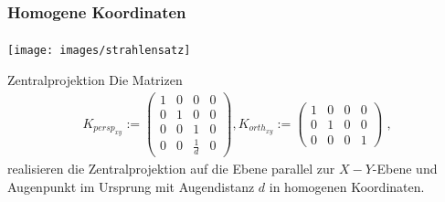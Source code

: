 \documentclass{beamer}
\begin{document}
\begin{frame}
    \frametitle{Homogene Koordinaten}
\framesubtitle{}
\begin{center}
    \texttt{[image: images/strahlensatz]}
\end{center}
\begin{block}{Zentralprojektion}
Die Matrizen
\begin{align*}
K_{persp_{xy}} := \begin{pmatrix}  
1   &  0 & 0 & 0  \\
0   &  1 & 0 & 0  \\
0   &  0 & 1 & 0  \\
0   &  0 & \frac{1}{d} & 0 
\end{pmatrix} ,
K_{orth_{xy}} := \begin{pmatrix}  
1   &  0 & 0 & 0  \\
0   &  1 & 0 & 0  \\
0   &  0 & 0 & 1  
\end{pmatrix} \; ,
\end{align*}
realisieren die Zentralprojektion auf die Ebene parallel zur $X-Y$-Ebene und Augenpunkt im Ursprung mit Augendistanz $d$ in homogenen Koordinaten.


\end{block}
\end{frame}
\end{document}
